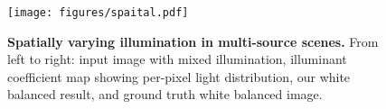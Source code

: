 \begin{figure}[ht]
    \centering
    \vspace{-2mm}
    \texttt{[image: figures/spaital.pdf]}
\vspace{-7mm}
    \caption{\textbf{Spatially varying illumination in multi-source scenes.} From left to right: input image with mixed illumination, illuminant coefficient map showing per-pixel light distribution, our white balanced result, and ground truth white balanced image.}
    \label{fig:spaital_varying}
\end{figure}